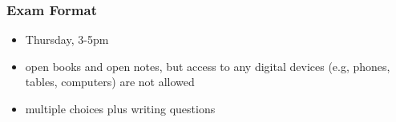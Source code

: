 \documentclass[10pt]{beamer}
\newcommand{\bitemize}{\begin{itemize}}
\newcommand{\eitemize}{\end{itemize}}
\newcommand{\bblock}{\begin{block}}
\newcommand{\eblock}{\end{block}}
\begin{document}
\begin{frame}

\frametitle{Exam Format}

\bitemize
\item Thursday, 3-5pm 
\item open books and open notes, but access to any digital devices (e.g, phones, tables, computers) are not allowed
\item multiple choices plus writing questions
\eitemize

\end{frame}


\end{document}
